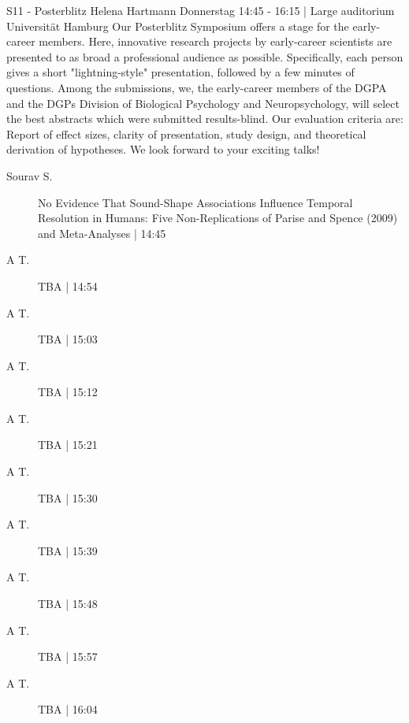 
            \begin{symposium}
            {S11 - Posterblitz}
            {Helena Hartmann}
            {Donnerstag 14:45 - 16:15 | Large auditorium}
            {Universität Hamburg}
            Our Posterblitz Symposium offers a stage for the early-career members. Here, innovative research projects by early-career scientists are presented to as broad a professional audience as possible. Specifically, each person gives a short "lightning-style" presentation, followed by a few minutes of questions. Among the submissions, we, the early-career members of the DGPA and the DGPs Division of Biological Psychology and Neuropsychology, will select the best abstracts which were submitted results-blind. Our evaluation criteria are: Report of effect sizes, clarity of presentation, study design, and theoretical derivation of hypotheses. We look forward to your exciting talks! 
            \begin{description}    
            
                \item [ Sourav S.] No Evidence That Sound-Shape Associations Influence Temporal Resolution in Humans: Five Non-Replications of Parise and Spence (2009) and Meta-Analyses \textcolor{mygray}{ | 14:45}    
                
                \item [A T.] TBA \textcolor{mygray}{ | 14:54}    
                
                \item [A T.] TBA \textcolor{mygray}{ | 15:03}    
                
                \item [A T.] TBA \textcolor{mygray}{ | 15:12}    
                
                \item [A T.] TBA \textcolor{mygray}{ | 15:21}    
                
                \item [A T.] TBA \textcolor{mygray}{ | 15:30}    
                
                \item [A T.] TBA \textcolor{mygray}{ | 15:39}    
                
                \item [A T.] TBA \textcolor{mygray}{ | 15:48}    
                
                \item [A T.] TBA \textcolor{mygray}{ | 15:57}    
                
                \item [A T.] TBA \textcolor{mygray}{ | 16:04}    
                
            \end{description} 
            \end{symposium}
            